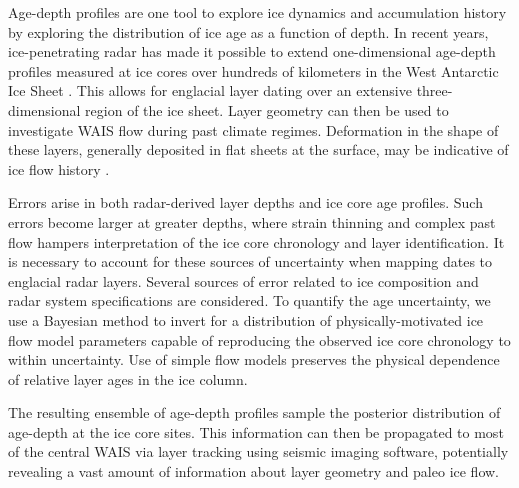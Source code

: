 \documentclass[12pt]{article}
\begin{document}
Age-depth profiles are one tool to explore ice dynamics and accumulation history by exploring the distribution of ice age as a function of depth. In recent years, ice-penetrating radar has made it possible to extend one-dimensional age-depth profiles measured at ice cores over hundreds of kilometers in the West Antarctic Ice Sheet \citep[e.g.][]{neumann2008,holt2006}. This allows for englacial layer dating over an extensive three-dimensional region of the ice sheet. Layer geometry can then be used to investigate WAIS flow during past climate regimes. Deformation in the shape of these layers, generally deposited in flat sheets at the surface, may be indicative of ice flow history \citep[e.g.][]{siegert2004}.

Errors arise in both radar-derived layer depths and ice core age profiles. Such errors become larger at greater depths, where strain thinning and complex past flow hampers interpretation of the ice core chronology and layer identification. It is necessary to account for these sources of uncertainty when mapping dates to englacial radar layers. Several sources of error related to ice composition and radar system specifications are considered. To quantify the age uncertainty, we use a Bayesian method to invert for a distribution of physically-motivated ice flow model parameters capable of reproducing the observed ice core chronology to within uncertainty. Use of simple flow models preserves the physical dependence of relative layer ages in the ice column. 

The resulting ensemble of age-depth profiles sample the posterior distribution of age-depth at the ice core sites. This information can then be propagated to most of the central WAIS via layer tracking using seismic imaging software, potentially revealing a vast amount of information about layer geometry and paleo ice flow.

\end{document}
